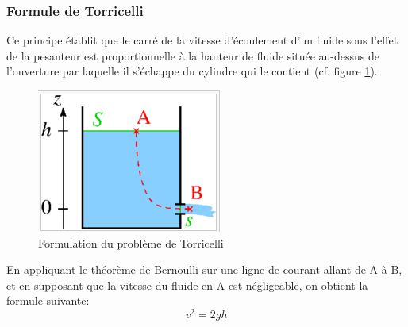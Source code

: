 \documentclass[10pt,a4paper]{article}
\begin{document}
\subsubsection{Formule de Torricelli}
Ce principe établit que le carré de la vitesse d'écoulement d'un fluide sous l'effet de la pesanteur est proportionnelle à la hauteur de fluide située au-dessus de l'ouverture par laquelle il s'échappe du cylindre qui le contient (cf. figure \ref{fig:torricelli}).
\begin{figure}
\centering
\includegraphics[scale=0.5]{torricelli}
\caption{Formulation du problème de Torricelli}
\label{fig:torricelli}
\end{figure}
En appliquant le théorème de Bernoulli sur une ligne de courant allant de A à B, et en supposant que la vitesse du fluide en A est négligeable, on obtient la formule suivante:
\begin{equation}
v^{2} = 2gh
\end{equation}

\newpage


\end{document}
